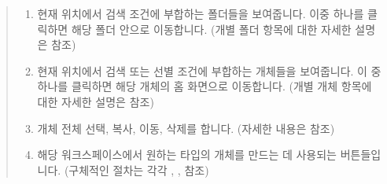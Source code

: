 \documentclass[letterpaper,10pt,english]{sphinxmanual}
\begin{document}
\begin{quote}
\begin{enumerate}
\begin{itemize}
\end{itemize}

\item {} 
 현재 위치에서 검색 조건에 부합하는 폴더들을 보여줍니다. 이중 하나를 클릭하면 해당 폴더 안으로 이동합니다. (개별 폴더 항목에 대한 자세한 설명은 {\hyperref[\detokenize{discovery/part03/workspace_management:folders}]{}} 참조)

\item {} 
 현재 위치에서 검색 또는 선별 조건에 부합하는 개체들을 보여줍니다. 이 중 하나를 클릭하면 해당 개체의 홈 화면으로 이동합니다. (개별 개체 항목에 대한 자세한 설명은 {\hyperref[\detokenize{discovery/part03/workspace_management:items}]{}} 참조)

\item {} 
 개체 전체 선택, 복사, 이동, 삭제를 합니다. (자세한 내용은 {\hyperref[\detokenize{discovery/part03/workspace_management:actions}]{}} 참조)

\item {} 
 해당 워크스페이스에서 원하는 타입의 개체를 만드는 데 사용되는 버튼들입니다. (구체적인 절차는 각각 {\hyperref[\detokenize{discovery/part04/create_a_workbook::doc}]{}}, {\hyperref[\detokenize{discovery/part05/create_a_notebook::doc}]{}}, {\hyperref[\detokenize{discovery/part06/06_02-create_a_workbench::doc}]{}} 참조)

\end{enumerate}
\end{quote}
\end{document}
